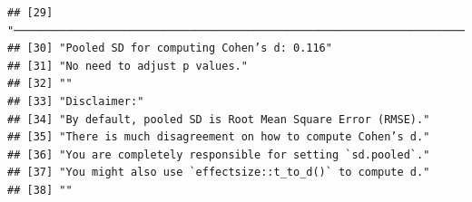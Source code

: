 \documentclass[
  man]{apa6}
\begin{document}
\begin{verbatim}
## [29] "─────────────────────────────────────────────────────────────────────────────────"  
## [30] "Pooled SD for computing Cohen’s d: 0.116"                                           
## [31] "No need to adjust p values."                                                        
## [32] ""                                                                                   
## [33] "Disclaimer:"                                                                        
## [34] "By default, pooled SD is Root Mean Square Error (RMSE)."                            
## [35] "There is much disagreement on how to compute Cohen’s d."                            
## [36] "You are completely responsible for setting `sd.pooled`."                            
## [37] "You might also use `effectsize::t_to_d()` to compute d."                            
## [38] ""
\end{verbatim}
\end{document}
